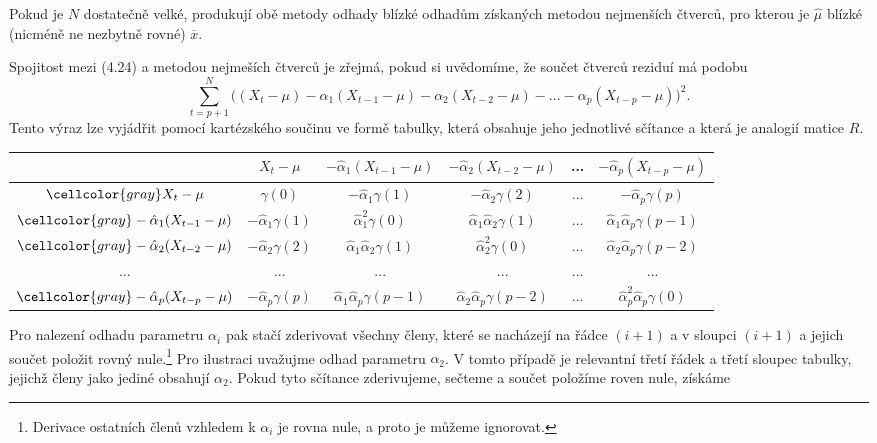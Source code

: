 Pokud je $N$ dostatečně velké, produkují obě metody odhady blízké odhadům získaných metodou nejmenších čtverců, pro kterou je $\hat{\mu}$ blízké (nicméně ne nezbytně rovné) $\overline{x}$.

Spojitost mezi (4.24) a metodou nejmeších čtverců je zřejmá, pokud si uvědomíme, že součet čtverců reziduí má podobu
\begin{equation}
\sum_{t = p + 1}^N \Big((X_t - \mu) - \alpha_1 (X_{t-1} - \mu) - \alpha_2 (X_{t-2} - \mu) - ... - \alpha_p (X_{t - p} - \mu) \Big)^2.
\end{equation}
Tento výraz lze vyjádřit pomocí kartézského součinu ve formě tabulky, která obsahuje jeho jednotlivé sčítance a která je analogií matice $R$.
\begin{center}
\tiny
\begin{tabular}{| c | c | c | c | c | c |}
\hline
\cellcolor{gray} & \cellcolor{gray}$X_t - \mu$ & \cellcolor{gray}$-\hat{\alpha}_1 (X_{t-1} - \mu)$ & \cellcolor{gray}$-\hat{\alpha}_2 (X_{t-2} - \mu)$ & \cellcolor{gray}... & \cellcolor{gray}$-\hat{\alpha}_p (X_{t-p} - \mu)$ \\ \hline
$\cellcolor{gray}X_t - \mu$ & $\gamma(0)$ & $-\hat{\alpha}_1 \gamma(1)$ & $-\hat{\alpha}_2 \gamma(2)$ & ... & $-\hat{\alpha}_p \gamma(p)$ \\ \hline
$\cellcolor{gray}-\hat{\alpha}_1 (X_{t-1} - \mu)$ & $-\hat{\alpha}_1 \gamma(1)$ & $\hat{\alpha}_1^2 \gamma(0)$ & $\hat{\alpha}_1 \hat{\alpha}_2 \gamma(1)$ & ... & $\hat{\alpha}_1 \hat{\alpha}_p \gamma(p - 1)$ \\ \hline
$\cellcolor{gray}-\hat{\alpha}_2 (X_{t-2} - \mu)$ & $-\hat{\alpha}_2 \gamma(2)$ & $\hat{\alpha}_1 \hat{\alpha}_2 \gamma(1)$ & $\hat{\alpha}_2^2 \gamma(0)$ & ... & $\hat{\alpha}_2 \hat{\alpha}_p \gamma(p - 2)$ \\ \hline
\cellcolor{gray}... & ... & ... & ... & ... & ... \\ \hline
$\cellcolor{gray}-\hat{\alpha}_p (X_{t-p} - \mu)$ & $-\hat{\alpha}_p \gamma(p)$ & $\hat{\alpha}_1 \hat{\alpha}_p \gamma(p-1)$ & $\hat{\alpha}_2 \hat{\alpha}_p \gamma(p-2)$ & ... & $\hat{\alpha}_p^2 \hat{\alpha}_p \gamma(0)$ \\ \hline
\end{tabular}
\end{center}
Pro nalezení odhadu parametru $\alpha_i$ pak stačí zderivovat všechny členy, které se nacházejí na řádce $(i + 1)$ a v sloupci $(i+1)$ a jejich součet položit rovný nule.\footnote{Derivace ostatních členů vzhledem k $\alpha_i$ je rovna nule, a proto je můžeme ignorovat.} Pro ilustraci uvažujme odhad parametru $\alpha_2$. V tomto případě je relevantní třetí řádek a třetí sloupec tabulky, jejichž členy jako jediné obsahují $\alpha_2$. Pokud tyto sčítance zderivujeme, sečteme a součet položíme roven nule, získáme
